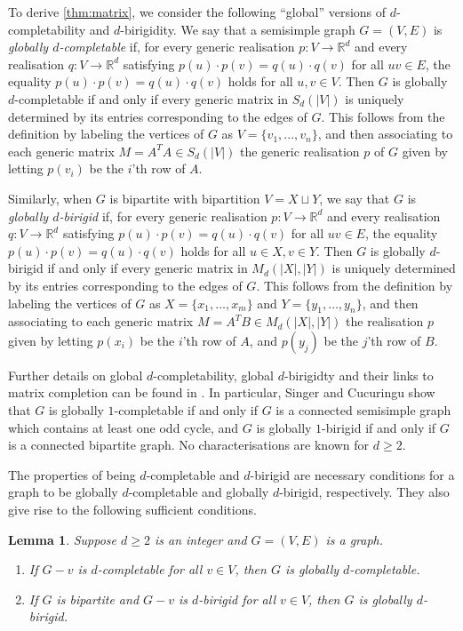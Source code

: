 \documentclass[11pt,a4paper,dvipsnames]{scrartcl}
\newtheorem{lemma}[theorem]{Lemma}
\newcommand{\R}{{\mathbb{R}}}
\begin{document}
To derive \cref{thm:matrix}, we consider the following ``global'' versions of $d$-completability and $d$-birigidity.
We say that a semisimple graph $G = (V,E)$ is \emph{globally $d$-completable} if, for every generic realisation $p:V \to \R^d$ and every realisation $q: V \to \R^d$ satisfying $p(u) \cdot p(v) = q(u) \cdot q(v)$ for all $uv \in E$, the equality $p(u) \cdot p(v) = q(u) \cdot q(v)$ holds for all $u,v \in V$. Then $G$ is globally $d$-completable if and only if every generic matrix in $S_d(|V|)$ is uniquely determined by its entries corresponding to the edges of $G$. This follows from the definition by labeling the vertices of $G$ as $V = \{v_1,\ldots,v_n\}$, and then associating to each generic matrix $M = A^TA \in S_d(|V|)$ the generic realisation $p$ of $G$ given by letting $p(v_i)$ be the $i$'th row of $A$.

Similarly, when $G$ is bipartite with bipartition $V=X\sqcup Y$, we say that $G$ is \emph{globally $d$-birigid} if, for every generic realisation $p:V \to \R^d$ and every realisation $q: V \to \R^d$ satisfying $p(u) \cdot p(v) = q(u) \cdot q(v)$ for all $uv \in E$, the equality $p(u) \cdot p(v) = q(u) \cdot q(v)$ holds for all $u \in X,v \in Y$. Then $G$ is globally $d$-birigid if and only if every generic matrix in $M_d(|X|,|Y|)$ is uniquely determined by its entries corresponding to the edges of $G$. This follows from the definition by labeling the vertices of $G$ as $X = \{x_1,\ldots,x_m\}$ and $Y = \{y_1,\ldots,y_n\}$, and then associating to each generic matrix $M = A^TB \in M_d(|X|,|Y|)$ the realisation $p$ given by letting $p(x_i)$ be the $i$'th row of $A$, and $p(y_j)$ be the $j$'th row of $B$. %

Further details on global $d$-completability, global $d$-birigidty  and their links to matrix completion can be found in \cite{SC,JJT2}.
In particular,
Singer and Cucuringu \cite{SC} show that $G$ is globally $1$-completable if and only if $G$ is a connected semisimple graph which contains at least one odd cycle, and $G$ is globally $1$-birigid if and only if $G$ is a connected bipartite graph. No characterisations are known for $d\geq 2$. 

The properties of being $d$-completable and $d$-birigid are necessary conditions for a graph to be globally $d$-completable and globally $d$-birigid, respectively. They also give rise to the following sufficient conditions.

\begin{lemma}\label{thm:redundant} Suppose $d\geq 2$ is an integer and $G=(V,E)$ is a graph.\begin{enumerate}
\item If $G-v$ is  $d$-completable for all $v\in V$, then $G$ is globally $d$-completable.
\item If $G$ is  bipartite and $G-v$ is $d$-birigid for all $v\in V$, then $G$ is globally $d$-birigid.
\end{enumerate}
\end{lemma}
\end{document}
